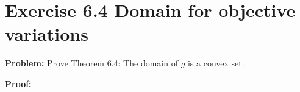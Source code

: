 \section{Exercise 6.4 Domain for objective variations}
\textbf{Problem:} Prove Theorem 6.4: The domain of $g$ is a convex set.

\textbf{Proof:} 